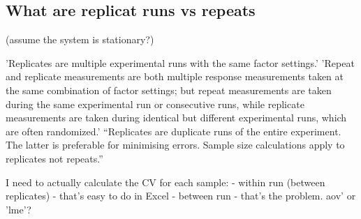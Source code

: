 \subsection{What are replicat runs vs repeats}
(assume the system is stationary?)

'Replicates are multiple experimental runs with the same factor settings.' 'Repeat and replicate measurements are both multiple response measurements taken at the same combination of factor settings; but repeat measurements are taken during the same experimental run or consecutive runs, while replicate measurements are taken during identical but different experimental runs, which are often randomized.'
\cite{http://support.minitab.com/en-us/minitab/17/topic-library/modeling-statistics/doe/basics/replicates-and-repeats-in-designed-experiments/}
``Replicates are duplicate runs of the entire experiment.
The latter is preferable for minimising errors. Sample size calculations apply to replicates not repeats.''

I need to actually calculate the CV for each sample: \cite{http://r.789695.n4.nabble.com/Need-to-calculate-within-and-between-run-CV-td866024.html}
  - within run (between replicates) - that's easy to do in Excel
  - between run - that's the problem.
  aov' or 'lme'? 
